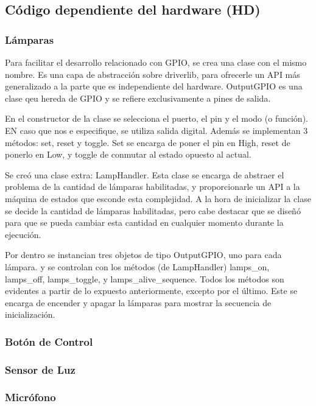 \subsection{Código dependiente del hardware (HD)}

\subsubsection{Lámparas}
Para facilitar el desarrollo relacionado con GPIO, se crea una clase con el mismo nombre. Es una
capa de abstracción sobre driverlib, para ofrecerle un API más generalizado a la parte que es
independiente del hardware. OutputGPIO es una clase qeu hereda de GPIO y se refiere exclusivamente a
pines de salida.

En el constructor de la clase  se selecciona el puerto, el pin y el modo (o función). EN caso que
nos e especifique, se utiliza salida digital. Además se implementan 3 métodos: set, reset y
toggle. Set se encarga de poner el pin en High, reset de ponerlo en Low, y toggle de conmutar al
estado opuesto al actual.

Se creó una clase extra: LampHandler. Esta clase se encarga de abstraer el problema de la cantidad
de lámparas habilitadas, y proporcionarle un API a la máquina de estados que esconde esta
complejidad. A la hora de inicializar la clase se decide la cantidad de lámparas habilitadas, pero
cabe destacar que se diseñó para que se pueda cambiar esta cantidad en cualquier momento durante la
ejecución.

Por dentro se instancian tres objetos de tipo OutputGPIO, uno para cada lámpara. y se controlan con
los métodos (de LampHandler) lamps_on, lamps_off, lamps_toggle, y lamps_alive_sequence. Todos los
métodos son evidentes a partir de lo expuesto anteriormente, excepto por el último. Este se encarga
de encender y apagar la lámparas para mostrar la secuencia de inicialización. 

\subsubsection{Botón de Control}

\subsubsection{Sensor de Luz}
\subsubsection{Micrófono}




